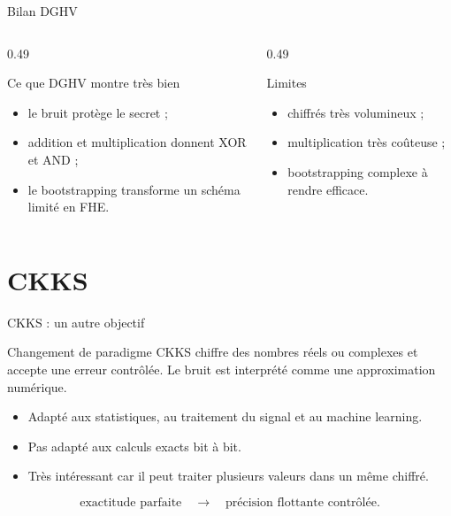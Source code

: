 \documentclass[10pt,aspectratio=169]{beamer}
\begin{document}
\begin{frame}{Bilan DGHV}
  \begin{columns}[T,onlytextwidth]
    \begin{column}{0.49\textwidth}
      \begin{exampleblock}{Ce que DGHV montre très bien}
        \begin{itemize}
          \item le bruit protège le secret ;
          \item addition et multiplication donnent XOR et AND ;
          \item le bootstrapping transforme un schéma limité en FHE.
        \end{itemize}
      \end{exampleblock}
    \end{column}
    \begin{column}{0.49\textwidth}
      \begin{block}{Limites}
        \begin{itemize}
          \item chiffrés très volumineux ;
          \item multiplication très coûteuse ;
          \item bootstrapping complexe à rendre efficace.
        \end{itemize}
      \end{block}
    \end{column}
  \end{columns}
\end{frame}

\section{CKKS}

\begin{frame}{CKKS : un autre objectif}
  \begin{block}{Changement de paradigme}
    CKKS chiffre des nombres réels ou complexes et accepte une erreur contrôlée. Le bruit est interprété comme une approximation numérique.
  \end{block}

  \begin{itemize}
    \item Adapté aux statistiques, au traitement du signal et au machine learning.
    \item Pas adapté aux calculs exacts bit à bit.
    \item Très intéressant car il peut traiter plusieurs valeurs dans un même chiffré.
  \end{itemize}

  \begin{center}
    \[
      \text{exactitude parfaite}
      \quad \longrightarrow \quad
      \text{précision flottante contrôlée}.
    \]
  \end{center}
\end{frame}
\end{document}
